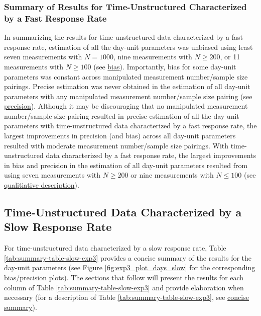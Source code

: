 \documentclass[
12pt, %
twoside,
english]{guelphthesis}
\begin{document}
\hypertarget{summary-of-results-for-time-unstructured-characterized-by-a-fast-response-rate}{%
\subsubsection{Summary of Results for Time-Unstructured Characterized by a Fast Response Rate}\label{summary-of-results-for-time-unstructured-characterized-by-a-fast-response-rate}}

In summarizing the results for time-unstructured data characterized by a fast response rate, estimation of all the day-unit parameters was unbiased using least seven measurements with \(N = 1000\), nine measurements with \(N \ge 200\), or 11 measurements with \(N \ge 100\) (see \protect\hyperlink{bias-fast-exp3}{bias}). Importantly, bias for some day-unit parameters was constant across manipulated measurement number/sample size pairings. Precise estimation was never obtained in the estimation of all day-unit parameters with any manipulated measurement number/sample size pairing (see \protect\hyperlink{precision-fast-exp3}{precision}). Although it may be discouraging that no manipulated measurement number/sample size pairing resulted in precise estimation of all the day-unit parameters with time-unstructured data characterized by a fast response rate, the largest improvements in precision (and bias) across all day-unit parameters resulted with moderate measurement number/sample size pairings. With time-unstructured data characterized by a fast response rate, the largest improvements in bias and precision in the estimation of all day-unit parameters resulted from using seven measurements with \(N \ge 200\) or nine measurements with \(N \le 100\) (see \protect\hyperlink{qualitative-fast-exp3}{qualitiative description}).

\hypertarget{time-unstructured-data-characterized-by-a-slow-response-rate}{%
\subsection{Time-Unstructured Data Characterized by a Slow Response Rate}\label{time-unstructured-data-characterized-by-a-slow-response-rate}}

For time-unstructured data characterized by a slow response rate, Table \ref{tab:summary-table-slow-exp3} provides a concise summary of the results for the day-unit parameters (see Figure \ref{fig:exp3_plot_days_slow} for the corresponding bias/precision plots). The sections that follow will present the results for each column of Table \ref{tab:summary-table-slow-exp3} and provide elaboration when necessary (for a description of Table \ref{tab:summary-table-slow-exp3}, see \protect\hyperlink{concise-example-exp3}{concise summary}).
\end{document}
